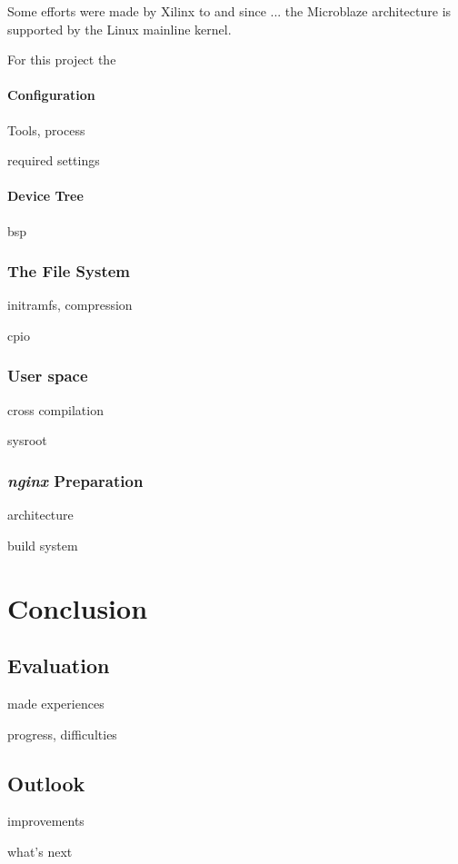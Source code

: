 Some efforts were made by Xilinx to and since ... the Microblaze architecture is supported by the Linux mainline kernel.

For this project the 

\subsubsection{Configuration}

Tools, process

required settings

\subsubsection{Device Tree}

bsp



\subsection{The File System}

initramfs, compression

cpio

\subsection{User space}

cross compilation

sysroot

\subsection{\textit{nginx} Preparation}

architecture

build system

\chapter{Conclusion}

\section{Evaluation}

made experiences

progress, difficulties

\section{Outlook}

improvements

what's next

